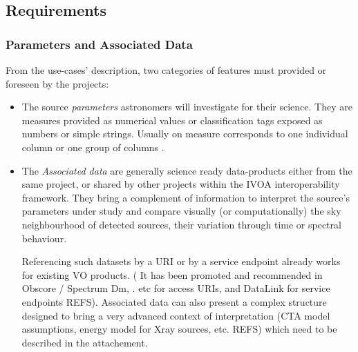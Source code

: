 \documentclass[11pt,a4paper]{ivoa}
\begin{document}
\subsection{Requirements}

\subsubsection{Parameters and Associated Data}
From the use-cases' description, two categories of features must provided or foreseen by the projects:

  \begin{itemize}
    \item The source \emph{parameters} astronomers will investigate for their science. They are measures provided as numerical values or classification tags exposed as numbers or simple strings. Usually on measure corresponds to one individual column or one group of columns .
     \item The \emph{Associated data} are generally science ready data-products either from the same project, or shared by other projects within the IVOA interoperability framework.
They bring a complement of information to interpret the source's  parameters under study and compare visually (or computationally) the sky neighbourhood of detected sources, their variation through time or spectral behaviour.

Referencing such datasets by a URI or by a service endpoint already works for existing VO products. ( It has been promoted and recommended in Obscore / Spectrum Dm, . etc for access URIs, and DataLink for service endpoints REFS).
Associated data can also present a complex structure designed to bring a very advanced context of interpretation (CTA model assumptions, energy model for Xray sources, etc. REFS) which need to be described in the attachement.
 \end{itemize}     
\end{document}
